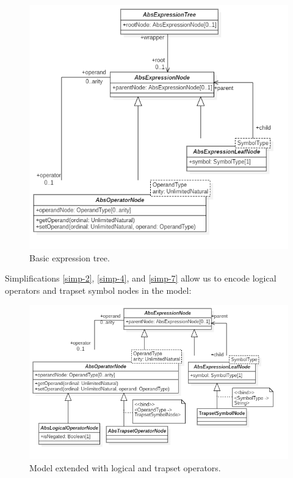 \documentclass[12pt,oneside,a4paper,notitlepage]{report}
\begin{document}
	\begin{figure}[h]
		\begin{center}
			\includegraphics[width=\textwidth]
			{Models/BasicAbstractExpressionTree}
		\end{center}
		\caption{Basic expression tree.}
		\label{fig:basic-expr-tree}
	\end{figure}

	\newpage

	\par Simplifications \ref{simp-2}, \ref{simp-4}, and \ref{simp-7} allow us to encode logical operators and trapset symbol nodes in the model:

	\begin{figure}[h]
		\begin{center}
			\includegraphics[width=\textwidth]
			{Models/BasicConcreteExpressionTree}
		\end{center}
		\caption{Model extended with logical and trapset operators.}
		\label{fig:basic-concrete-expr-tree}
	\end{figure}
\end{document}
